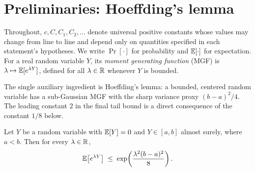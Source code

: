\section{Preliminaries: Hoeffding's lemma}
\label{sec:hoeffding-lemma}

Throughout, $c, C, C_1, C_2, \ldots$ denote universal positive constants whose
values may change from line to line and depend only on quantities specified in
each statement's hypotheses. We write $\Pr[\cdot]$ for probability and
$\mathbb{E}[\cdot]$ for expectation. For a real random variable $Y$, its
\emph{moment generating function} (MGF) is $\lambda \mapsto \mathbb{E}[e^{\lambda Y}]$,
defined for all $\lambda \in \mathbb{R}$ whenever $Y$ is bounded.

The single auxiliary ingredient is Hoeffding's lemma: a bounded, centered
random variable has a sub-Gaussian MGF with the sharp variance proxy
$(b-a)^2/4$. The leading constant $2$ in the final tail bound is a direct
consequence of the constant $1/8$ below.

\begin{lemma}\label{lem:hoeffding}
Let $Y$ be a random variable with $\mathbb{E}[Y] = 0$ and $Y \in [a, b]$ almost surely,
where $a < b$. Then for every $\lambda \in \mathbb{R}$,
\begin{align}\label{eq:hoeffding-lemma}
\mathbb{E}\!\left[ e^{\lambda Y} \right] \;\le\; \exp\!\left( \frac{\lambda^2 (b - a)^2}{8} \right).
\end{align}
\end{lemma}

